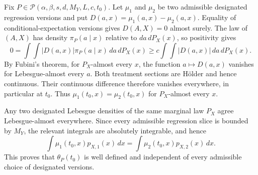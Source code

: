 Fix \(P\in\mathcal P(\alpha,\beta,s,d,M_Y,L,c,t_0)\). Let \(\mu_1\) and \(\mu_2\) be two admissible designated regression versions and put \(D(a,x)=\mu_1(a,x)-\mu_2(a,x)\). Equality of conditional-expectation versions gives \(D(A,X)=0\) almost surely. The law of \((A,X)\) has density \(\pi_P(a\mid x)\) relative to \(da\,dP_X(x)\), so positivity gives
\[
0=\int\!\int \lvert D(a,x)\rvert\pi_P(a\mid x)\,da\,dP_X(x)
\ge c\int\!\int \lvert D(a,x)\rvert\,da\,dP_X(x).
\]
By Fubini's theorem, for \(P_X\)-almost every \(x\), the function \(a\mapsto D(a,x)\) vanishes for Lebesgue-almost every \(a\). Both treatment sections are H\"older and hence continuous. Their continuous difference therefore vanishes everywhere, in particular at \(t_0\). Thus \(\mu_1(t_0,x)=\mu_2(t_0,x)\) for \(P_X\)-almost every \(x\).

Any two designated Lebesgue densities of the same marginal law \(P_X\) agree Lebesgue-almost everywhere. Since every admissible regression slice is bounded by \(M_Y\), the relevant integrals are absolutely integrable, and hence
\[
\int\mu_1(t_0,x)p_{X,1}(x)\,dx
=
\int\mu_2(t_0,x)p_{X,2}(x)\,dx.
\]
This proves that \(\theta_P(t_0)\) is well defined and independent of every admissible choice of designated versions.